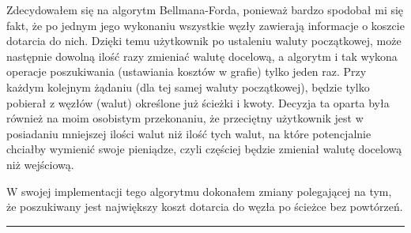 \documentclass[a4paper,11pt]{article}
\newcommand{\linia}{\rule{\linewidth}{0.4mm}}
\begin{document}
Zdecydowałem się na algorytm Bellmana-Forda, ponieważ bardzo spodobał mi się fakt, że po jednym jego wykonaniu wszystkie węzły zawierają informacje o koszcie dotarcia do nich. Dzięki temu użytkownik po ustaleniu waluty początkowej, może następnie dowolną ilość razy zmieniać walutę docelową, a algorytm i tak wykona operacje poszukiwania (ustawiania kosztów w grafie) tylko jeden raz. Przy każdym kolejnym żądaniu (dla tej samej waluty początkowej), będzie tylko pobierał z węzłów (walut) określone już ścieżki i kwoty. Decyzja ta oparta była również na moim osobistym przekonaniu, że przeciętny użytkownik jest w posiadaniu mniejszej ilości walut niż ilość tych walut, na które potencjalnie chciałby wymienić swoje pieniądze, czyli częściej będzie zmieniał walutę docelową niż wejściową.

W swojej implementacji tego algorytmu dokonałem zmiany polegającej na tym, że poszukiwany jest największy koszt dotarcia do węzła po ścieżce bez powtórzeń.


\noindent\linia
\end{document}
